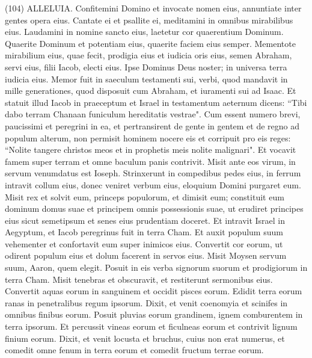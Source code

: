 \begin{biblechapter}  (104) 
\verse ALLELUIA. Confitemini Domino et invocate nomen eius, annuntiate inter gentes opera eius. 
\verse Cantate ei et psallite ei, meditamini in omnibus mirabilibus eius. 
\verse Laudamini in nomine sancto eius, laetetur cor quaerentium Dominum. 
\verse Quaerite Dominum et potentiam eius, quaerite faciem eius semper. 
\verse Mementote mirabilium eius, quae fecit, prodigia eius et iudicia oris eius, 
\verse semen Abraham, servi eius, filii Iacob, electi eius. 
\verse Ipse Dominus Deus noster; in universa terra iudicia eius. 
\verse Memor fuit in saeculum testamenti sui, verbi, quod mandavit in mille generationes, 
\verse quod disposuit cum Abraham, et iuramenti sui ad Isaac. 
\verse Et statuit illud Iacob in praeceptum et Israel in testamentum aeternum 
\verse dicens: “Tibi dabo terram Chanaan funiculum hereditatis vestrae". 
\verse Cum essent numero brevi, paucissimi et peregrini in ea, 
\verse et pertransirent de gente in gentem et de regno ad populum alterum, 
\verse non permisit hominem nocere eis et corripuit pro eis reges: 
\verse “Nolite tangere christos meos et in prophetis meis nolite malignari". 
\verse Et vocavit famem super terram et omne baculum panis contrivit. 
\verse Misit ante eos virum, in servum venumdatus est Ioseph. 
\verse Strinxerunt in compedibus pedes eius, in ferrum intravit collum eius, 
\verse donec veniret verbum eius, eloquium Domini purgaret eum. 
\verse Misit rex et solvit eum, princeps populorum, et dimisit eum; 
\verse constituit eum dominum domus suae et principem omnis possessionis suae, 
\verse ut erudiret principes eius sicut semetipsum et senes eius prudentiam doceret. 
\verse Et intravit Israel in Aegyptum, et Iacob peregrinus fuit in terra Cham. 
\verse Et auxit populum suum vehementer et confortavit eum super inimicos eius. 
\verse Convertit cor eorum, ut odirent populum eius et dolum facerent in servos eius. 
\verse Misit Moysen servum suum, Aaron, quem elegit. 
\verse Posuit in eis verba signorum suorum et prodigiorum in terra Cham. 
\verse Misit tenebras et obscuravit, et restiterunt sermonibus eius. 
\verse Convertit aquas eorum in sanguinem et occidit pisces eorum. 
\verse Edidit terra eorum ranas in penetralibus regum ipsorum. 
\verse Dixit, et venit coenomyia et scinifes in omnibus finibus eorum. 
\verse Posuit pluvias eorum grandinem, ignem comburentem in terra ipsorum. 
\verse Et percussit vineas eorum et ficulneas eorum et contrivit lignum finium eorum. 
\verse Dixit, et venit locusta et bruchus, cuius non erat numerus, 
\verse et comedit omne fenum in terra eorum et comedit fructum terrae eorum. 

\end{biblechapter}
